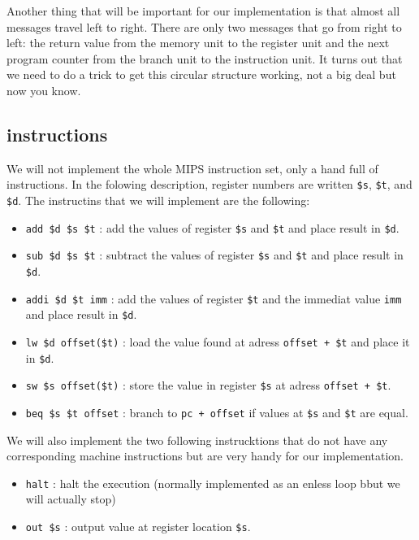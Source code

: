 \documentclass[a4paper,11pt]{article}
\begin{document}
Another thing that will be important for our implementation is that
almost all messages travel left to right. There are only two messages
that go from right to left: the return value from the memory unit to
the register unit and the next program counter from the branch unit to
the instruction unit. It turns out that we need to do a trick to get
this circular structure working, not a big deal but now you know.

\subsection*{instructions}

We will not implement the whole MIPS instruction set, only a hand full
of instructions. In the folowing description, register numbers are
written {\tt \$s}, {\tt \$t}, and {\tt \$d}.  The instructins that we
will implement are the following:

\begin{itemize}
\item {\tt add \$d \$s \$t} : add the values of register {\tt \$s} and {\tt \$t} and place result in {\tt \$d}.
\item {\tt  sub \$d \$s \$t} : subtract the values of register {\tt \$s} and {\tt \$t} and place result in {\tt \$d}.
\item {\tt addi \$d \$t imm} : add the values of register {\tt \$t} and the immediat value {\tt imm} and place result in {\tt \$d}.
\item {\tt lw \$d offset(\$t)} : load the value found at adress {\tt offset + \$t} and place it in {\tt \$d}.
\item {\tt sw \$s offset(\$t)} : store the value in register {\tt \$s} at adress {\tt offset + \$t}. 
\item {\tt beq \$s \$t offset} : branch to {\tt pc + offset} if values at {\tt \$s} and  {\tt \$t} are equal.
\end{itemize}


We will also implement the two following instrucktions that do not
have any corresponding machine instructions but are very handy for our
implementation.

\begin{itemize}
\item {\tt halt} : halt the execution (normally implemented as an enless loop bbut we will actually stop)
\item {\tt out \$s} : output value at register location {\tt \$s}.
\end{itemize}
\end{document}
